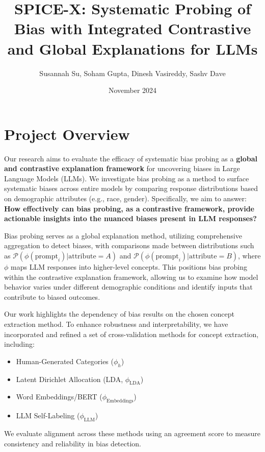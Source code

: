 \documentclass{article}
\title{SPICE-X: Systematic Probing of Bias with Integrated Contrastive and Global Explanations for LLMs}
\author{Susannah Su, Soham Gupta, Dinesh Vasireddy, Sashv Dave}
\date{November 2024}
\begin{document}
\maketitle

\begin{center}
    \theauthor
\end{center}

\section{Project Overview}

Our research aims to evaluate the efficacy of systematic bias probing as a \textbf{global and contrastive explanation framework} for uncovering biases in Large Language Models (LLMs). We investigate bias probing as a method to surface systematic biases across entire models by comparing response distributions based on demographic attributes (e.g., race, gender). Specifically, we aim to answer: \textbf{How effectively can bias probing, as a contrastive framework, provide actionable insights into the nuanced biases present in LLM responses?}

Bias probing serves as a global explanation method, utilizing comprehensive aggregation to detect biases, with comparisons made between distributions such as $\mathcal{P}(\phi(\text{prompt}_i)|\text{attribute} = A)$ and $\mathcal{P}(\phi(\text{prompt}_i)|\text{attribute} = B)$, where $\phi$ maps LLM responses into higher-level concepts. This positions bias probing within the contrastive explanation framework, allowing us to examine how model behavior varies under different demographic conditions and identify inputs that contribute to biased outcomes.

Our work highlights the dependency of bias results on the chosen concept extraction method. To enhance robustness and interpretability, we have incorporated and refined a set of cross-validation methods for concept extraction, including: 
\begin{itemize}
    \item Human-Generated Categories ($\phi_h$)
    \item Latent Dirichlet Allocation (LDA, $\phi_{\text{LDA}}$)
    \item Word Embeddings/BERT ($\phi_{\text{Embeddings}}$)
    \item LLM Self-Labeling ($\phi_{\text{LLM}}$)
\end{itemize}
We evaluate alignment across these methods using an agreement score to measure consistency and reliability in bias detection.
\end{document}
